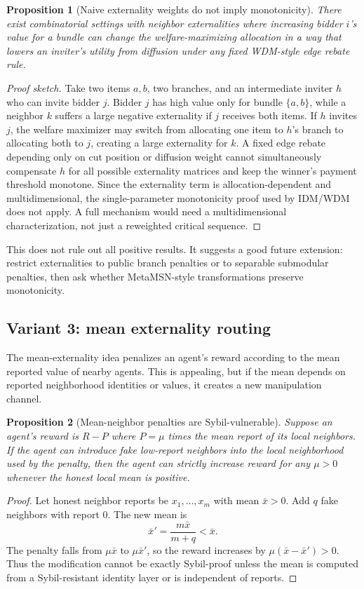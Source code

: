 \documentclass[11pt]{article}
\newtheorem{proposition}{Proposition}
\begin{document}
\begin{proposition}[Naive externality weights do not imply monotonicity]
There exist combinatorial settings with neighbor externalities where increasing bidder $i$'s value for a bundle can change the welfare-maximizing allocation in a way that lowers an inviter's utility from diffusion under any fixed WDM-style edge rebate rule.
\end{proposition}
\begin{proof}[Proof sketch]
Take two items $a,b$, two branches, and an intermediate inviter $h$ who can invite bidder $j$. Bidder $j$ has high value only for bundle $\{a,b\}$, while a neighbor $k$ suffers a large negative externality if $j$ receives both items. If $h$ invites $j$, the welfare maximizer may switch from allocating one item to $h$'s branch to allocating both to $j$, creating a large externality for $k$. A fixed edge rebate depending only on cut position or diffusion weight cannot simultaneously compensate $h$ for all possible externality matrices and keep the winner's payment threshold monotone. Since the externality term is allocation-dependent and multidimensional, the single-parameter monotonicity proof used by IDM/WDM does not apply. A full mechanism would need a multidimensional characterization, not just a reweighted critical sequence.
\end{proof}

This does not rule out all positive results. It suggests a good future extension: restrict externalities to public branch penalties or to separable submodular penalties, then ask whether MetaMSN-style transformations preserve monotonicity.

\subsection{Variant 3: mean externality routing}

The mean-externality idea penalizes an agent's reward according to the mean reported value of nearby agents. This is appealing, but if the mean depends on reported neighborhood identities or values, it creates a new manipulation channel.

\begin{proposition}[Mean-neighbor penalties are Sybil-vulnerable]
Suppose an agent's reward is $R-P$ where $P=\mu$ times the mean report of its local neighbors. If the agent can introduce fake low-report neighbors into the local neighborhood used by the penalty, then the agent can strictly increase reward for any $\mu>0$ whenever the honest local mean is positive.
\end{proposition}
\begin{proof}
Let honest neighbor reports be $x_1,\ldots,x_m$ with mean $\bar x>0$. Add $q$ fake neighbors with report $0$. The new mean is
\[
    \bar x' = \frac{m\bar x}{m+q}<\bar x.
\]
The penalty falls from $\mu\bar x$ to $\mu\bar x'$, so the reward increases by $\mu(\bar x-\bar x')>0$. Thus the modification cannot be exactly Sybil-proof unless the mean is computed from a Sybil-resistant identity layer or is independent of reports.
\end{proof}
\end{document}
